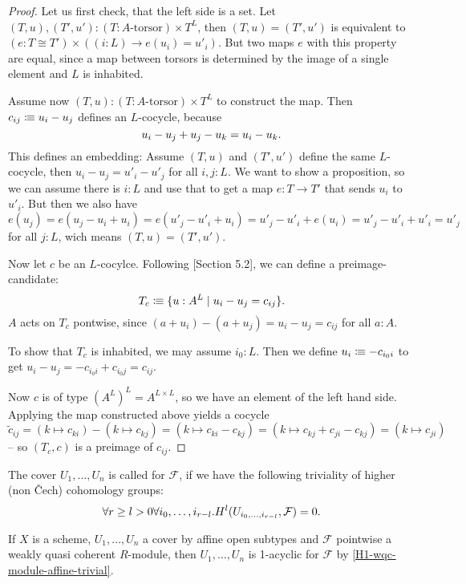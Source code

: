 \begin{proof}
  Let us first check, that the left side is a set.
  Let $(T,u),(T',u'):(T:\text{$A$-torsor})\times T^L$,
  then $(T,u)=(T',u')$ is equivalent to $(e:T\cong T')\times ((i:L)\to e(u_i)=u'_i)$.
  But two maps $e$ with this property are equal,
  since a map between torsors is determined by the image of a single element and $L$ is inhabited.
  
  Assume now $(T,u):(T:\text{$A$-torsor})\times T^L$ to construct the map.
  Then $c_{ij}\vcentcolon\mspace{-1.2mu}\equiv u_i-u_j$ defines an $L$-cocycle,
  because
  \[
    u_i-u_j + u_j-u_k = u_i-u_k
    \rlap{.}
  \]
  This defines an embedding: Assume $(T,u)$ and $(T',u')$ define the same $L$-cocycle,
  then $u_i-u_j=u'_i-u'_j$ for all $i,j:L$.
  We want to show a proposition, so we can assume there is $i:L$ and use that to get a map $e:T\to T'$
  that sends $u_i$ to $u'_i$.
  But then we also have
  \[
    e(u_j)=e(u_j-u_i+u_i)=e(u'_j-u'_i+u_i)=u'_j-u'_i+e(u_i)=u'_j-u'_i+u'_i=u'_j
  \]
  for all $j:L$, wich means $(T,u)=(T',u')$.
    
  Now let $c$ be an $L$-cocylce.
  Following \cite{Deligne91}[Section 5.2], we can define a preimage-candidate:
  \[
    T_c\colonequiv \{u:A^L\mid u_i-u_j=c_{ij}\}
    \rlap{.}
  \]
  $A$ acts on $T_c$ pontwise, since $(a+u_i)-(a+u_j)=u_i-u_j=c_{ij}$ for all $a:A$.
  
  To show that $T_c$ is inhabited,
  we may assume $i_0:L$.
  Then we define $u_i\vcentcolon\mspace{-1.2mu}\equiv -c_{i_0i}$ to get $u_i-u_j=-c_{i_0i}+c_{i_0j}=c_{ij}$.

  Now $c$ is of type $(A^L)^L=A^{L\times L}$, so we have an element of the left hand side.
  Applying the map constructed above yields a cocycle
  \[
    \tilde{c}_{ij}=(k\mapsto c_{ki})-(k\mapsto c_{kj})=(k\mapsto c_{ki}-c_{kj})=(k\mapsto c_{kj}+c_{ji}-c_{kj})=(k\mapsto c_{ji})
  \]
  -- so $(T_c,c)$ is a preimage of $c_{ij}$.
\end{proof}

\begin{definition}
  The cover $U_1,\dots,U_n$ is called  for $\mathcal F$,
  if we have the following triviality of higher (non Čech) cohomology groups:
  \[
    \forall r\geq l>0\forall i_0,\dots,i_{r-l}. H^l(U_{i_0,\dots,i_{r-l}},\mathcal F)=0\rlap{.}
  \]
\end{definition}

\begin{example}
  If $X$ is a scheme, $U_1,\dots,U_n$ a cover by affine open subtypes
  and $\mathcal F$ pointwise a weakly quasi coherent $R$-module,
  then $U_1,\dots,U_n$ is 1-acyclic for $\mathcal F$ by \cref{H1-wqc-module-affine-trivial}.
\end{example}

